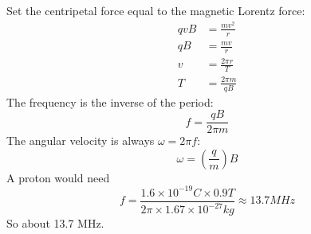 \documentclass[10pt]{article}
\begin{document}
\begin{enumerate}
\begin{enumerate}
Set the centripetal force equal to the magnetic Lorentz force:
\begin{align}
qvB &= \frac{mv^2}{r} \\
qB &= \frac{mv}{r} \\
v &= \frac{2\pi r}{T} \\
T &= \frac{2\pi m}{qB}
\end{align}
The frequency is the inverse of the period:
\begin{equation}
f = \frac{qB}{2\pi m}
\end{equation}
The angular velocity is always $\omega = 2\pi f$:
\begin{equation}
\omega = \left(\frac{q}{m}\right) B
\end{equation}
A proton would need
\begin{equation}
f = \frac{1.6 \times 10^{-19} C \times 0.9 T}{2\pi \times 1.67 \times 10^{-27} kg} \approx 13.7 MHz
\end{equation}
So about 13.7 MHz.
\end{enumerate}
\end{enumerate}
\end{document}

